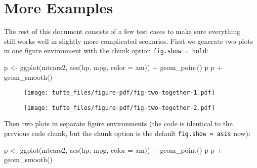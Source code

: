 \documentclass[
  letterpaper,
  DIV=11,
  numbers=noendperiod,
  oneside]{scrartcl}
\newenvironment{Shaded}{\begin{snugshade}}{\end{snugshade}}
\newcommand{\AttributeTok}[1]{\textcolor[rgb]{0.40,0.45,0.13}{#1}}
\newcommand{\FunctionTok}[1]{\textcolor[rgb]{0.28,0.35,0.67}{#1}}
\newcommand{\NormalTok}[1]{\textcolor[rgb]{0.00,0.23,0.31}{#1}}
\newcommand{\OtherTok}[1]{\textcolor[rgb]{0.00,0.23,0.31}{#1}}
\newcommand{\SpecialCharTok}[1]{\textcolor[rgb]{0.37,0.37,0.37}{#1}}
\begin{document}
\hypertarget{more-examples}{%
\section{More Examples}\label{more-examples}}

The rest of this document consists of a few test cases to make sure
everything still works well in slightly more complicated scenarios.
First we generate two plots in one figure environment with the chunk
option \texttt{fig.show\ =\ \textquotesingle{}hold\textquotesingle{}}:

\begin{Shaded}
\begin{Highlighting}[]
\NormalTok{p }\OtherTok{\textless{}{-}} \FunctionTok{ggplot}\NormalTok{(mtcars2, }\FunctionTok{aes}\NormalTok{(hp, mpg, }\AttributeTok{color =}\NormalTok{ am)) }\SpecialCharTok{+}
  \FunctionTok{geom\_point}\NormalTok{()}
\NormalTok{p}
\NormalTok{p }\SpecialCharTok{+} \FunctionTok{geom\_smooth}\NormalTok{()}
\end{Highlighting}
\end{Shaded}

\begin{figure}[H]


{\centering \texttt{[image: tufte\_files/figure-pdf/fig-two-together-1.pdf]}

}

\end{figure}

\begin{figure}[H]


{\centering \texttt{[image: tufte\_files/figure-pdf/fig-two-together-2.pdf]}

}

\end{figure}

Then two plots in separate figure environments (the code is identical to
the previous code chunk, but the chunk option is the default
\texttt{fig.show\ =\ \textquotesingle{}asis\textquotesingle{}} now):

\begin{Shaded}
\begin{Highlighting}[]
\NormalTok{p }\OtherTok{\textless{}{-}} \FunctionTok{ggplot}\NormalTok{(mtcars2, }\FunctionTok{aes}\NormalTok{(hp, mpg, }\AttributeTok{color =}\NormalTok{ am)) }\SpecialCharTok{+}
  \FunctionTok{geom\_point}\NormalTok{()}
\NormalTok{p}
\NormalTok{p }\SpecialCharTok{+} \FunctionTok{geom\_smooth}\NormalTok{()}
\end{Highlighting}
\end{Shaded}
\end{document}
